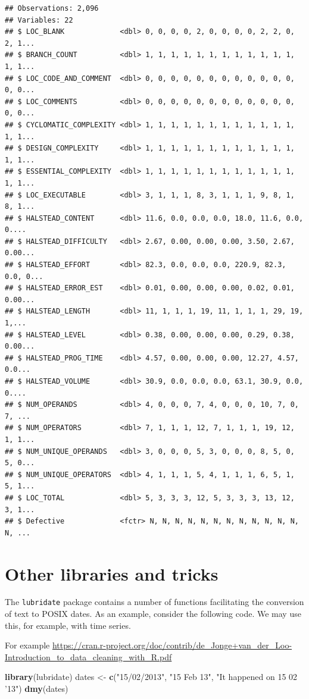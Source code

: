 \documentclass[]{book}
\newenvironment{Shaded}{\begin{snugshade}}{\end{snugshade}}
\newcommand{\KeywordTok}[1]{\textcolor[rgb]{0.13,0.29,0.53}{\textbf{{#1}}}}
\newcommand{\StringTok}[1]{\textcolor[rgb]{0.31,0.60,0.02}{{#1}}}
\newcommand{\NormalTok}[1]{{#1}}
\begin{document}
\begin{verbatim}
## Observations: 2,096
## Variables: 22
## $ LOC_BLANK             <dbl> 0, 0, 0, 0, 2, 0, 0, 0, 0, 2, 2, 0, 2, 1...
## $ BRANCH_COUNT          <dbl> 1, 1, 1, 1, 1, 1, 1, 1, 1, 1, 1, 1, 1, 1...
## $ LOC_CODE_AND_COMMENT  <dbl> 0, 0, 0, 0, 0, 0, 0, 0, 0, 0, 0, 0, 0, 0...
## $ LOC_COMMENTS          <dbl> 0, 0, 0, 0, 0, 0, 0, 0, 0, 0, 0, 0, 0, 0...
## $ CYCLOMATIC_COMPLEXITY <dbl> 1, 1, 1, 1, 1, 1, 1, 1, 1, 1, 1, 1, 1, 1...
## $ DESIGN_COMPLEXITY     <dbl> 1, 1, 1, 1, 1, 1, 1, 1, 1, 1, 1, 1, 1, 1...
## $ ESSENTIAL_COMPLEXITY  <dbl> 1, 1, 1, 1, 1, 1, 1, 1, 1, 1, 1, 1, 1, 1...
## $ LOC_EXECUTABLE        <dbl> 3, 1, 1, 1, 8, 3, 1, 1, 1, 9, 8, 1, 8, 1...
## $ HALSTEAD_CONTENT      <dbl> 11.6, 0.0, 0.0, 0.0, 18.0, 11.6, 0.0, 0....
## $ HALSTEAD_DIFFICULTY   <dbl> 2.67, 0.00, 0.00, 0.00, 3.50, 2.67, 0.00...
## $ HALSTEAD_EFFORT       <dbl> 82.3, 0.0, 0.0, 0.0, 220.9, 82.3, 0.0, 0...
## $ HALSTEAD_ERROR_EST    <dbl> 0.01, 0.00, 0.00, 0.00, 0.02, 0.01, 0.00...
## $ HALSTEAD_LENGTH       <dbl> 11, 1, 1, 1, 19, 11, 1, 1, 1, 29, 19, 1,...
## $ HALSTEAD_LEVEL        <dbl> 0.38, 0.00, 0.00, 0.00, 0.29, 0.38, 0.00...
## $ HALSTEAD_PROG_TIME    <dbl> 4.57, 0.00, 0.00, 0.00, 12.27, 4.57, 0.0...
## $ HALSTEAD_VOLUME       <dbl> 30.9, 0.0, 0.0, 0.0, 63.1, 30.9, 0.0, 0....
## $ NUM_OPERANDS          <dbl> 4, 0, 0, 0, 7, 4, 0, 0, 0, 10, 7, 0, 7, ...
## $ NUM_OPERATORS         <dbl> 7, 1, 1, 1, 12, 7, 1, 1, 1, 19, 12, 1, 1...
## $ NUM_UNIQUE_OPERANDS   <dbl> 3, 0, 0, 0, 5, 3, 0, 0, 0, 8, 5, 0, 5, 0...
## $ NUM_UNIQUE_OPERATORS  <dbl> 4, 1, 1, 1, 5, 4, 1, 1, 1, 6, 5, 1, 5, 1...
## $ LOC_TOTAL             <dbl> 5, 3, 3, 3, 12, 5, 3, 3, 3, 13, 12, 3, 1...
## $ Defective             <fctr> N, N, N, N, N, N, N, N, N, N, N, N, N, ...
\end{verbatim}

\section{Other libraries and tricks}\label{other-libraries-and-tricks}

The \texttt{lubridate} package contains a number of functions
facilitating the conversion of text to POSIX dates. As an example,
consider the following code. We may use this, for example, with time
series.

For example
\url{https://cran.r-project.org/doc/contrib/de_Jonge+van_der_Loo-Introduction_to_data_cleaning_with_R.pdf}

\begin{Shaded}
\begin{Highlighting}[]
\KeywordTok{library}\NormalTok{(lubridate)}
\NormalTok{dates <-}\StringTok{ }\KeywordTok{c}\NormalTok{(}\StringTok{"15/02/2013"}\NormalTok{, }\StringTok{"15 Feb 13"}\NormalTok{, }\StringTok{"It happened on 15 02 '13"}\NormalTok{)}
\KeywordTok{dmy}\NormalTok{(dates)}
\end{Highlighting}
\end{Shaded}
\end{document}
